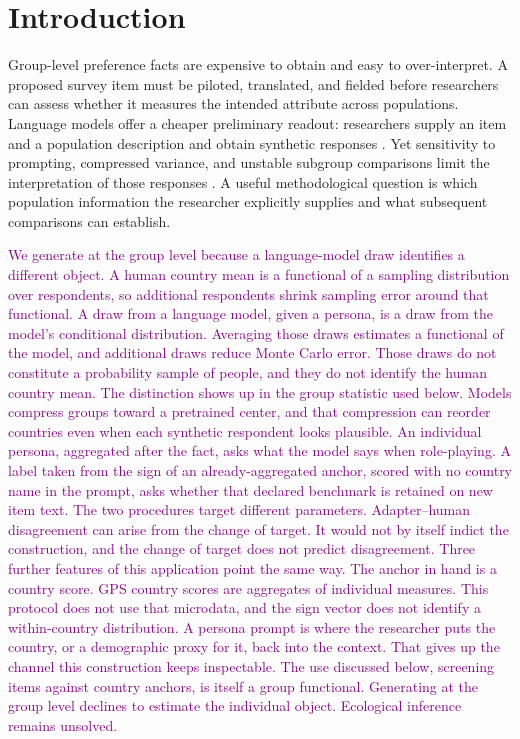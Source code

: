 \section{Introduction}\label{sec:introduction}
Group-level preference facts are expensive to obtain and easy to over-interpret. A proposed survey item must be piloted, translated, and fielded before researchers can assess whether it measures the intended attribute across populations. Language models offer a cheaper preliminary readout: researchers supply an item and a population description and obtain synthetic responses \cite{argyle2023,horton2023,buskirk2026}. Yet sensitivity to prompting, compressed variance, and unstable subgroup comparisons limit the interpretation of those responses \cite{bisbee2024,boelaert2025,wang2025}. A useful methodological question is which population information the researcher explicitly supplies and what subsequent comparisons can establish.

\textcolor{purple}{We generate at the group level because a language-model draw identifies a different object. A human country mean is a functional of a sampling distribution over respondents, so additional respondents shrink sampling error around that functional. A draw from a language model, given a persona, is a draw from the model's conditional distribution. Averaging those draws estimates a functional of the model, and additional draws reduce Monte Carlo error. Those draws do not constitute a probability sample of people, and they do not identify the human country mean. The distinction shows up in the group statistic used below. Models compress groups toward a pretrained center, and that compression can reorder countries even when each synthetic respondent looks plausible. An individual persona, aggregated after the fact, asks what the model says when role-playing. A label taken from the sign of an already-aggregated anchor, scored with no country name in the prompt, asks whether that declared benchmark is retained on new item text. The two procedures target different parameters. Adapter--human disagreement can arise from the change of target. It would not by itself indict the construction, and the change of target does not predict disagreement. Three further features of this application point the same way. The anchor in hand is a country score. GPS country scores are aggregates of individual measures. This protocol does not use that microdata, and the sign vector does not identify a within-country distribution. A persona prompt is where the researcher puts the country, or a demographic proxy for it, back into the context. That gives up the channel this construction keeps inspectable. The use discussed below, screening items against country anchors, is itself a group functional. Generating at the group level declines to estimate the individual object. Ecological inference remains unsolved.}



